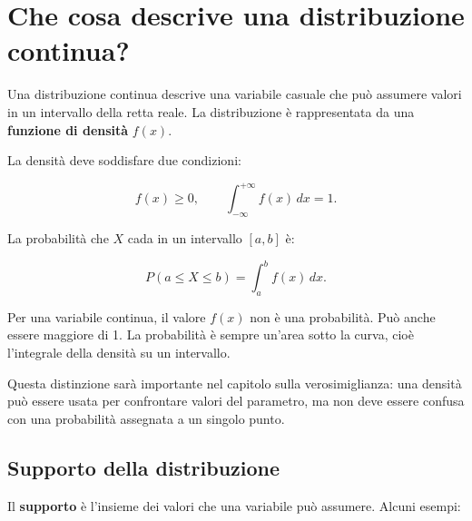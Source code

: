 \documentclass[
  italian,
  letterpaper,
  a4paper,
  11pt,
  open=any]{scrbook}
\theoremstyle{plain}
\theoremstyle{definition}
\theoremstyle{definition}
\theoremstyle{remark}
\begin{document}
\section{Che cosa descrive una distribuzione
continua?}\label{sec-continuous-distribution-meaning}

Una distribuzione continua descrive una variabile casuale che può
assumere valori in un intervallo della retta reale. La distribuzione è
rappresentata da una \textbf{funzione di densità} \(f(x)\).

La densità deve soddisfare due condizioni:

\[
f(x) \geq 0,
\qquad
\int_{-\infty}^{+\infty} f(x)\,dx = 1.
\]

La probabilità che \(X\) cada in un intervallo \([a,b]\) è:

\[
P(a \leq X \leq b) = \int_a^b f(x)\,dx.
\]

\begin{tcolorbox}[enhanced jigsaw, arc=.35mm, bottomrule=.15mm, bottomtitle=1mm, breakable, colback=white, colbacktitle=quarto-callout-important-color!10!white, colframe=quarto-callout-important-color-frame, coltitle=black, left=2mm, leftrule=.75mm, opacityback=0, opacitybacktitle=0.6, rightrule=.15mm, title=\textcolor{quarto-callout-important-color}{\faExclamation}\hspace{0.5em}{Densita non significa probabilita puntuale}, titlerule=0mm, toprule=.15mm, toptitle=1mm]

Per una variabile continua, il valore \(f(x)\) non è una probabilità.
Può anche essere maggiore di 1. La probabilità è sempre un'area sotto la
curva, cioè l'integrale della densità su un intervallo.

Questa distinzione sarà importante nel capitolo sulla verosimiglianza:
una densità può essere usata per confrontare valori del parametro, ma
non deve essere confusa con una probabilità assegnata a un singolo
punto.

\end{tcolorbox}

\subsection{Supporto della
distribuzione}\label{supporto-della-distribuzione}

Il \textbf{supporto} è l'insieme dei valori che una variabile può
assumere. Alcuni esempi:
\end{document}

